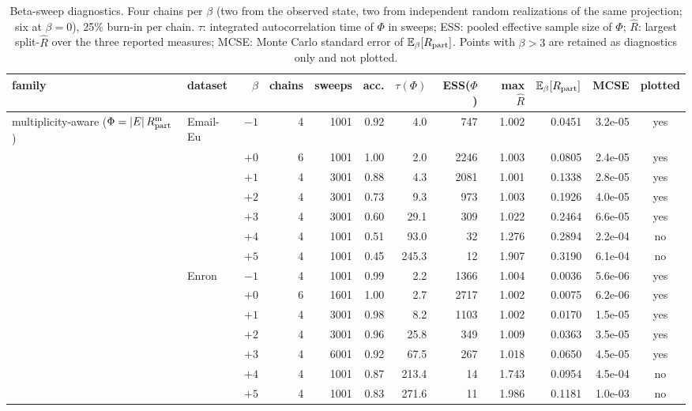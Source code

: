 \begin{table}[t]
\centering
\caption{Beta-sweep diagnostics. Four chains per $\beta$ (two from the observed state, two from independent random realizations of the same projection; six at $\beta=0$), 25\% burn-in per chain. $\tau$: integrated autocorrelation time of $\Phi$ in sweeps; ESS: pooled effective sample size of $\Phi$; $\widehat R$: largest split-$\widehat R$ over the three reported measures; MCSE: Monte Carlo standard error of $\mathbb E_\beta[R_{\rm part}]$. Points with $\beta>3$ are retained as diagnostics only and not plotted.}
\label{tab:beta-diag}
\small
\begin{tabular}{llrrrrrrrrrc}
\toprule
family & dataset & $\beta$ & chains & sweeps & acc. & $\tau(\Phi)$ & ESS($\Phi$) & max $\widehat R$ & $\mathbb E_\beta[R_{\rm part}]$ & MCSE & plotted \\
\midrule
multiplicity-aware ($\Phi=|E|\,R^{\rm m}_{\rm part}$) & Email-Eu & $-1$ & 4 & 1001 & 0.92 & 4.0 & 747 & 1.002 & 0.0451 & 3.2e-05 & yes \\
 &  & $+0$ & 6 & 1001 & 1.00 & 2.0 & 2246 & 1.003 & 0.0805 & 2.4e-05 & yes \\
 &  & $+1$ & 4 & 3001 & 0.88 & 4.3 & 2081 & 1.001 & 0.1338 & 2.8e-05 & yes \\
 &  & $+2$ & 4 & 3001 & 0.73 & 9.3 & 973 & 1.003 & 0.1926 & 4.0e-05 & yes \\
 &  & $+3$ & 4 & 3001 & 0.60 & 29.1 & 309 & 1.022 & 0.2464 & 6.6e-05 & yes \\
 &  & $+4$ & 4 & 1001 & 0.51 & 93.0 & 32 & 1.276 & 0.2894 & 2.2e-04 & no \\
 &  & $+5$ & 4 & 1001 & 0.45 & 245.3 & 12 & 1.907 & 0.3190 & 6.1e-04 & no \\
\addlinespace[2pt]
 & Enron & $-1$ & 4 & 1001 & 0.99 & 2.2 & 1366 & 1.004 & 0.0036 & 5.6e-06 & yes \\
 &  & $+0$ & 6 & 1601 & 1.00 & 2.7 & 2717 & 1.002 & 0.0075 & 6.2e-06 & yes \\
 &  & $+1$ & 4 & 3001 & 0.98 & 8.2 & 1103 & 1.002 & 0.0170 & 1.5e-05 & yes \\
 &  & $+2$ & 4 & 3001 & 0.96 & 25.8 & 349 & 1.009 & 0.0363 & 3.5e-05 & yes \\
 &  & $+3$ & 4 & 6001 & 0.92 & 67.5 & 267 & 1.018 & 0.0650 & 4.5e-05 & yes \\
 &  & $+4$ & 4 & 1001 & 0.87 & 213.4 & 14 & 1.743 & 0.0954 & 4.5e-04 & no \\
 &  & $+5$ & 4 & 1001 & 0.83 & 271.6 & 11 & 1.986 & 0.1181 & 1.0e-03 & no \\

\end{tabular}
\end{table}
